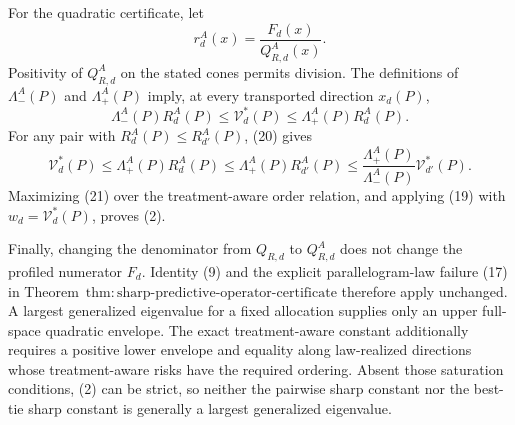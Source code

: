 For the quadratic certificate, let
\[
  r_d^A(x)=\frac{F_d(x)}{Q_{R,d}^A(x)}.
\]
Positivity of \(Q_{R,d}^A\) on the stated cones permits division.  The definitions of \(\Lambda_-^A(P)\) and \(\Lambda_+^A(P)\) imply, at every transported direction \(x_d(P)\),
\[
  \Lambda_-^A(P)R_d^A(P)
  \le\mathcal V_d^*(P)
  \le\Lambda_+^A(P)R_d^A(P).                              \tag{20}
\]
For any pair with \(R_d^A(P)\le R_{d'}^A(P)\), (20) gives
\[
 \mathcal V_d^*(P)
 \le\Lambda_+^A(P)R_d^A(P)
 \le\Lambda_+^A(P)R_{d'}^A(P)
 \le\frac{\Lambda_+^A(P)}{\Lambda_-^A(P)}
       \mathcal V_{d'}^*(P).                               \tag{21}
\]
Maximizing (21) over the treatment-aware order relation, and applying (19) with \(w_d=\mathcal V_d^*(P)\), proves (2).

Finally, changing the denominator from \(Q_{R,d}\) to \(Q_{R,d}^A\) does not change the profiled numerator \(F_d\).  Identity (9) and the explicit parallelogram-law failure (17) in Theorem~\(\mathrm{thm{:}sharp\text{-}predictive\text{-}operator\text{-}certificate}\) therefore apply unchanged.  A largest generalized eigenvalue for a fixed allocation supplies only an upper full-space quadratic envelope.  The exact treatment-aware constant additionally requires a positive lower envelope and equality along law-realized directions whose treatment-aware risks have the required ordering.  Absent those saturation conditions, (2) can be strict, so neither the pairwise sharp constant nor the best-tie sharp constant is generally a largest generalized eigenvalue.